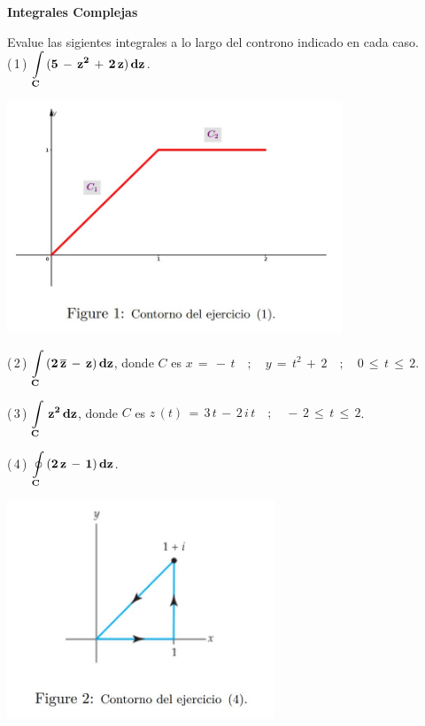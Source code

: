 \documentclass[a4paper,11pt,openany]{book}
\begin{document}
\newpage


\graphicspath{ {images/} }

\begin{center}
\textbf{Integrales Complejas}
\end{center}

Evalue las sigientes integrales a lo largo del controno indicado en cada caso.\\

\textcolor{ao(english)}{(\,1\,)} $\bf{\displaystyle\int\limits_{C}\,(5\,-\,z^{2}\,+\,2\,z)\,dz}$.

\begin{center}
     \includegraphics[width=10cm]{figura-1.JPG}
\end{center}

\textcolor{ao(english)}{(\,2\,)} $\bf{\displaystyle\int\limits_{C}\,(2\,\overline{z}\,-\,z)\,dz}$, \qquad donde \qquad $C$ es $x\,=\,-\,t \quad;\quad y\,=\,t^{2}\,+\,2 \quad;\quad 0\,\leq\,t\,\leq\,2$.

\textcolor{ao(english)}{(\,3\,)} $\bf{\displaystyle\int\limits_{C}\,z^{2}\,dz}$, \qquad donde \qquad $C$ es $z\,(t)\,=\,3\,t\,-\,2\,i\,t \quad;\quad -\,2\,\leq\,t\,\leq\,2$.

\textcolor{ao(english)}{(\,4\,)} $\bf{\displaystyle\oint\limits_{C}\,(2\,z\,-\,1)\,dz}$.

\begin{center}
     \includegraphics[width=8cm]{figura-2.JPG}
\end{center}
\end{document}
